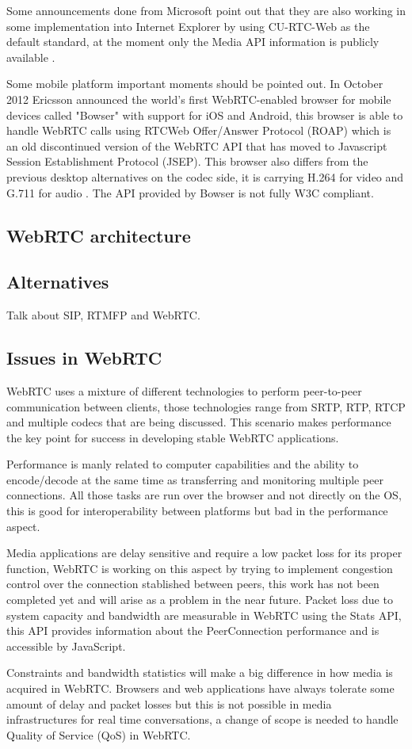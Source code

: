 Some announcements done from Microsoft point out that they are also working in some implementation into Internet Explorer by using CU-RTC-Web as the default standard, at the moment only the Media API information is publicly available \cite{microsoftcapture}.

Some mobile platform important moments should be pointed out. In October 2012 Ericsson announced the world's first WebRTC-enabled browser for mobile devices called "Bowser" with support for iOS and Android, this browser is able to handle WebRTC calls using RTCWeb Offer/Answer Protocol (ROAP) which is an old discontinued version of the WebRTC API that has moved to Javascript Session Establishment Protocol (JSEP). This browser also differs from the previous desktop alternatives on the codec side, it is carrying H.264 for video and G.711 for audio \cite{ericssonbowser}. The API provided by Bowser is not fully W3C compliant.

\subsection{WebRTC architecture}

\subsection{Alternatives}

Talk about SIP, RTMFP and WebRTC.



\subsection{Issues in WebRTC}

WebRTC uses a mixture of different technologies to perform peer-to-peer communication between clients, those technologies range from SRTP, RTP, RTCP and multiple codecs that are being discussed. This scenario makes performance the key point for success in developing stable WebRTC applications. 

Performance is manly related to computer capabilities and the ability to encode/decode at the same time as transferring and monitoring multiple peer connections. All those tasks are run over the browser and not directly on the OS, this is good for interoperability between platforms but bad in the performance aspect. 

Media applications are delay sensitive and require a low packet loss for its proper function, WebRTC is working on this aspect by trying to implement congestion control over the connection stablished between peers, this work has not been completed yet and will arise as a problem in the near future. Packet loss due to system capacity and bandwidth are measurable in WebRTC using the Stats API, this API provides information about the PeerConnection performance and is accessible by JavaScript.

Constraints and bandwidth statistics will make a big difference in how media is acquired in WebRTC. Browsers and web applications have always tolerate some amount of delay and packet losses but this is not possible in media infrastructures for real time conversations, a change of scope is needed to handle Quality of Service (QoS) in WebRTC.

